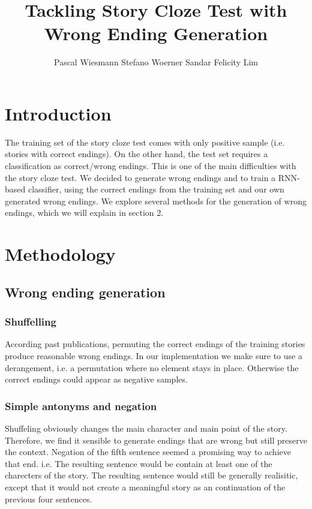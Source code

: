 \documentclass{article}
\title{Tackling Story Cloze Test with Wrong Ending Generation}
\author{Pascal Wiesmann \qquad Stefano Woerner \qquad Sandar Felicity Lim}
\begin{document}

\maketitle


\section{Introduction}

The training set of the story cloze test comes with only positive sample (i.e. stories with correct endings). On the other hand, the test set requires a classification as correct/wrong endings. This is one of the main difficulties with the story cloze test. We decided to generate wrong endings and to train a RNN-based classifier, using the correct endings from the training set and our own generated wrong endings. We explore several methods for the generation of wrong endings, which we will explain in section 2.

\section{Methodology}


\subsection{Wrong ending generation}

\subsubsection{Shuffelling} According past publications\cite{top4}, permuting the correct endings of the training stories produce reasonable wrong endings. In our implementation we make sure to use a derangement, i.e. a permutation where no element stays in place. Otherwise the correct endings could appear as negative samples.

\subsubsection{Simple antonyms and negation}

Shuffeling obviously changes the main character and main point of the story. Therefore, we find it sensible to generate endings that are wrong but still preserve the context. Negation of the fifth sentence seemed a promising way to achieve that end. i.e. The resulting sentence would be contain at least one of the charecters of the story. The resulting sentence would still be generally realisitic, except that it would not create a meaningful story as an continuation of the previous four sentences. 
\end{document}
